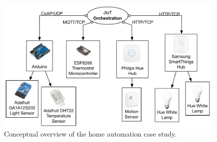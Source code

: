 \begin{figure}[t]
  \centering
  \includegraphics[width=\textwidth]{case_study_overview.pdf}
  \caption{Conceptual overview of the home automation case study.}
  \label{fig:case_study_overview} \end{figure}

